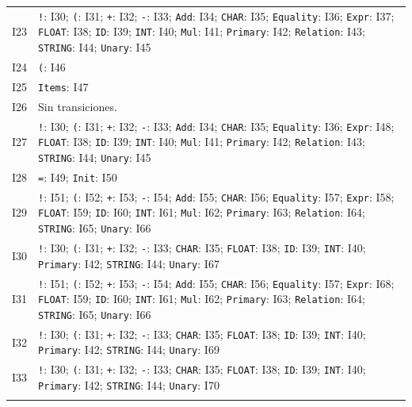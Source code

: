 {\begin{longtable}{@{}r p{14.7cm}@{}}
I23 & \texttt{!}: I30; \texttt{(}: I31; \texttt{+}: I32; \texttt{-}: I33; \texttt{Add}: I34; \texttt{CHAR}: I35; \texttt{Equality}: I36; \texttt{Expr}: I37; \texttt{FLOAT}: I38; \texttt{ID}: I39; \texttt{INT}: I40; \texttt{Mul}: I41; \texttt{Primary}: I42; \texttt{Relation}: I43; \texttt{STRING}: I44; \texttt{Unary}: I45\\\addlinespace[3pt]
I24 & \texttt{(}: I46\\\addlinespace[3pt]
I25 & \texttt{Items}: I47\\\addlinespace[3pt]
I26 & Sin transiciones.\\\addlinespace[3pt]
I27 & \texttt{!}: I30; \texttt{(}: I31; \texttt{+}: I32; \texttt{-}: I33; \texttt{Add}: I34; \texttt{CHAR}: I35; \texttt{Equality}: I36; \texttt{Expr}: I48; \texttt{FLOAT}: I38; \texttt{ID}: I39; \texttt{INT}: I40; \texttt{Mul}: I41; \texttt{Primary}: I42; \texttt{Relation}: I43; \texttt{STRING}: I44; \texttt{Unary}: I45\\\addlinespace[3pt]
I28 & \texttt{=}: I49; \texttt{Init}: I50\\\addlinespace[3pt]
I29 & \texttt{!}: I51; \texttt{(}: I52; \texttt{+}: I53; \texttt{-}: I54; \texttt{Add}: I55; \texttt{CHAR}: I56; \texttt{Equality}: I57; \texttt{Expr}: I58; \texttt{FLOAT}: I59; \texttt{ID}: I60; \texttt{INT}: I61; \texttt{Mul}: I62; \texttt{Primary}: I63; \texttt{Relation}: I64; \texttt{STRING}: I65; \texttt{Unary}: I66\\\addlinespace[3pt]
I30 & \texttt{!}: I30; \texttt{(}: I31; \texttt{+}: I32; \texttt{-}: I33; \texttt{CHAR}: I35; \texttt{FLOAT}: I38; \texttt{ID}: I39; \texttt{INT}: I40; \texttt{Primary}: I42; \texttt{STRING}: I44; \texttt{Unary}: I67\\\addlinespace[3pt]
I31 & \texttt{!}: I51; \texttt{(}: I52; \texttt{+}: I53; \texttt{-}: I54; \texttt{Add}: I55; \texttt{CHAR}: I56; \texttt{Equality}: I57; \texttt{Expr}: I68; \texttt{FLOAT}: I59; \texttt{ID}: I60; \texttt{INT}: I61; \texttt{Mul}: I62; \texttt{Primary}: I63; \texttt{Relation}: I64; \texttt{STRING}: I65; \texttt{Unary}: I66\\\addlinespace[3pt]
I32 & \texttt{!}: I30; \texttt{(}: I31; \texttt{+}: I32; \texttt{-}: I33; \texttt{CHAR}: I35; \texttt{FLOAT}: I38; \texttt{ID}: I39; \texttt{INT}: I40; \texttt{Primary}: I42; \texttt{STRING}: I44; \texttt{Unary}: I69\\\addlinespace[3pt]
I33 & \texttt{!}: I30; \texttt{(}: I31; \texttt{+}: I32; \texttt{-}: I33; \texttt{CHAR}: I35; \texttt{FLOAT}: I38; \texttt{ID}: I39; \texttt{INT}: I40; \texttt{Primary}: I42; \texttt{STRING}: I44; \texttt{Unary}: I70\\\addlinespace[3pt]

\end{longtable}}
